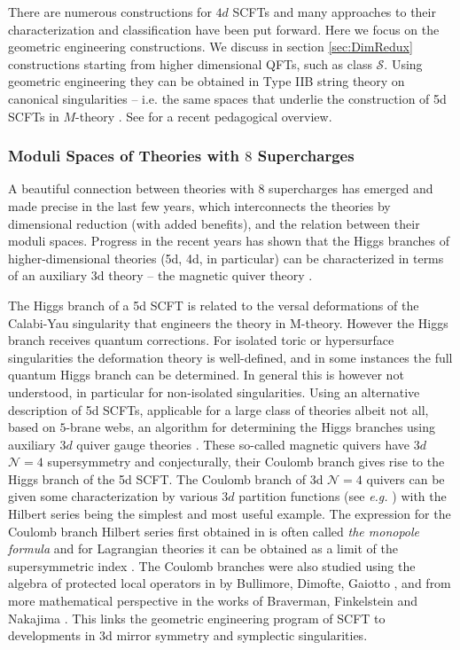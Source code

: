 \documentclass[12pt]{article}
\newcommand\CalN{\mathcal{N}}
\newcommand\CalS{\mathcal{S}}
\begin{document}
There are numerous constructions for $4d$ SCFTs and many approaches to their characterization and classification have been put forward. Here we focus on the geometric engineering constructions. 
 We discuss in section \ref{sec:DimRedux} constructions starting from higher dimensional QFTs, such as class ${\CalS}$.
 Using geometric engineering they can be obtained in Type IIB string theory on canonical singularities -- i.e. the same spaces that underlie the construction of 5d SCFTs in $M$-theory \cite{Shapere:1999xr,Xie:2015rpa, Chen:2016bzh, Wang:2016yha, Chen:2017wkw}. See \cite{Akhond:2021xio} for a recent pedagogical overview. 


\subsubsection{Moduli Spaces of Theories with $8$ Supercharges}

A beautiful connection between theories with $8$ supercharges has emerged and made precise in the last few years, which interconnects the theories by dimensional reduction (with added benefits), and the relation between their moduli spaces. Progress in the recent years has shown that the Higgs branches of higher-dimensional theories (5d, 4d, in particular) can be characterized in terms of an auxiliary 3d theory -- the magnetic quiver theory \cite{Cabrera:2019izd,Bourget:2019aer}. 

The Higgs branch of a 5d SCFT is related to the versal deformations of the Calabi-Yau singularity that engineers the theory in M-theory. However the Higgs branch receives quantum corrections. 
For isolated toric or hypersurface singularities \cite{Closset:2021lhd} the deformation theory is well-defined, and in some instances the full quantum Higgs branch can be determined. In general this is however not understood, in particular for non-isolated singularities. Using an alternative description of 5d SCFTs, applicable for a large class of theories albeit not all, based on $5$-brane webs, an algorithm for determining the Higgs branches using auxiliary $3d$ quiver gauge theories   \cite{Bourget:2019rtl, Bourget:2019aer}. These so-called magnetic quivers have $3d$ ${\CalN}=4$ supersymmetry and conjecturally, their Coulomb branch gives rise to the Higgs branch of the 5d SCFT. The Coulomb branch of 3d ${\CalN}=4$ quivers can be given some  characterization by various $3d$ partition functions (see {\it e.g.} \cite{Benini:2015noa,Willett:2016adv,Closset:2017zgf,Benini:2016hjo}) with the Hilbert series being the simplest and most useful example. The expression for the Coulomb branch Hilbert series  first obtained in \cite{Cremonesi:2013lqa} is often called {\it the monopole formula} and for Lagrangian theories it can be obtained as a limit of the supersymmetric index \cite{Razamat:2014pta}.
 The Coulomb branches were also studied  using the algebra of protected local operators in  by Bullimore, Dimofte, Gaiotto \cite{Bullimore:2015lsa}, and 
 from more   mathematical perspective in the  works of Braverman, Finkelstein and Nakajima \cite{Nakajima:2015txa,Braverman:2016wma}. This links the geometric engineering program of SCFT to developments in 3d mirror symmetry and symplectic singularities.
\end{document}
